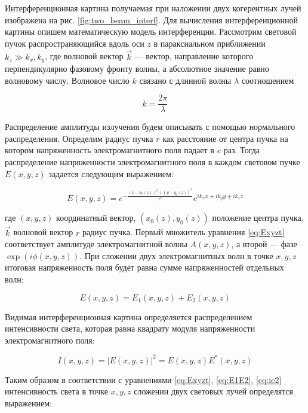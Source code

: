 Интерференционная картина получаемая при наложении двух когерентных лучей изображена на рис. \ref{fig:two_beam_interf}. Для вычисления интерференционной картины опишем математическую модель интерференции. Рассмотрим световой пучок распространяющийся вдоль оси $z$ в параксиальном приближении $k_z \gg k_x, k_y$, где волновой вектор $\vec{k}$ --- вектор, направление которого перпендикулярно фазовому фронту волны, а абсолютное значение равно волновому числу. Волновое число $k$ связано с длинной волны $\lambda$ соотношением 

\begin{equation*}
    k = \frac{2\pi}{\lambda}
\end{equation*}

Распределение амплитуды излучения будем описывать с помощью нормального распределения. Определим радиус пучка $r$ как расстояние от центра пучка на котором напряженность электромагнитного поля падает в $e$ раз. 
Тогда распределение напряженности электромагнитного поля в каждом световом пучке $E(x, y, z)$ задается следующим выражением: 

\begin{equation}
    E(x,y,z) = e^{-\frac{(x-x_0(z))^2+(y-y_0(z))^2}{r^2}} e^{i k_xx+ik_yy+ik_zz}    
\label{eq:Exyzt}
\end{equation}

где $(x,y,z)$ координатный вектор, $(x_0(z),y_0(z))$ положение центра пучка, $\vec{k}$ волновой вектор $r$ радиус пучка. %
Первый множитель уравнения \ref{eq:Exyzt} соответствует амплитуде электромагнитной волны $A(x,y,z)$, а второй --- фазе $\exp(i\phi(x,y,z))$. 
При сложении двух электромагнитных волн в точке $x, y, z$ итоговая напряженность поля будет равна сумме напряженностей отдельных волн: 

\begin{equation}
    E(x, y, z) = E_1(x, y, z) + E_2(x, y, z)
\label{eq:E1E2}
\end{equation}

Видимая интерференционная картина определяется распределением интенсивности света, которая равна квадрату модуля напряженности электромагнитного поля: 

\begin{equation}
    I(x, y, z) = |E(x, y, z)|^2 = E(x,y,z) E^*(x,y,z)
\label{eq:ie2}
\end{equation}

Таким образом в соответствии с уравнениями \ref{eq:Exyzt}, \ref{eq:E1E2}, \ref{eq:ie2} интенсивность света в точке $x, y, z$ сложении двух световых лучей определятся выражением: 

